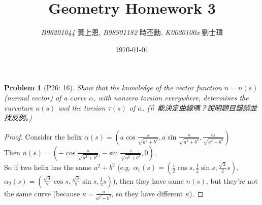 \documentclass[10pt,a4paper]{article}
\newcommand{\LiHei}{\CJKfamily{lh}}
\newcounter{theProblemCounter}
\newtheorem{problem}[theProblemCounter]{Problem}
\begin{document}
\title{{Geometry Homework 3}}
\author{{\it{B96201044}} {\LiHei 黃上恩}, {\it{B98901182}} {\LiHei 時丕勳}, {\it{K0020100x}} {\LiHei 劉士瑋}}
\date{\today}
\maketitle

\setcounter{theProblemCounter}{2}
\begin{problem}[P26: 16]
Show that the knowledge of the vector function $n=n(s)$ (normal vector) of a curve $\alpha$, with nonzero torsion everywhere, determines the curvature $\kappa(s)$ and the torsion $\tau(s)$ of $\alpha$.  ($\vec{n}$ 能決定曲線嗎？說明題目錯誤並找反例。)
\end{problem}
\begin{proof}
Consider the helix $\alpha(s)=(a\cos{\frac{s}{\sqrt{a^2+b^2}}},a\sin{\frac{s}{\sqrt{a^2+b^2}}},{\frac{bs}{\sqrt{a^2+b^2}}})$\\
Then $n(s)=(-\cos{\frac{s}{\sqrt{a^2+b^2}}},-\sin{\frac{s}{\sqrt{a^2+b^2}}},0)$.\\
So if two helix has the same $a^2+b^2$ (e.g. $\alpha_1(s)=(\frac{1}{2}\cos{s},\frac{1}{2}\sin{s},\frac{\sqrt{3}}{2}s)$, $\alpha_2(s)=(\frac{\sqrt{3}}{2}\cos{s},\frac{\sqrt{3}}{2}\sin{s},\frac{1}{2}s)$), then they have same $n(s)$, but they're not the same curve (because $\kappa=\frac{a}{a^2+b^2}$, so they have different $\kappa$).
\end{proof}
\end{document}

